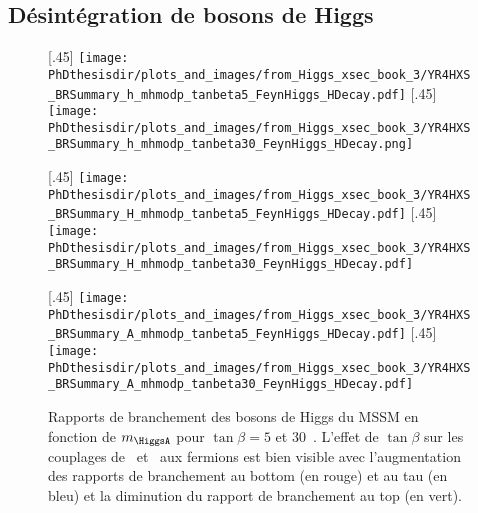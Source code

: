 \subsection{Désintégration de bosons de Higgs}\label{chapter-MS-MSSM-section-pheno_Higgs_MSSM-subsec-desintegration_Higgs}
\begin{figure}[p]
\centering
{}[.45\textwidth]
{\texttt{[image: \\PhDthesisdir/plots\_and\_images/from\_Higgs\_xsec\_book\_3/YR4HXS\_BRSummary\_h\_mhmodp\_tanbeta5\_FeynHiggs\_HDecay.pdf]}\vspace{-.5\baselineskip}}
\hfill
{}[.45\textwidth]
{\texttt{[image: \\PhDthesisdir/plots\_and\_images/from\_Higgs\_xsec\_book\_3/YR4HXS\_BRSummary\_h\_mhmodp\_tanbeta30\_FeynHiggs\_HDecay.png]}\vspace{-.5\baselineskip}}

\vspace{.75\baselineskip}
[.45\textwidth]
{\texttt{[image: \\PhDthesisdir/plots\_and\_images/from\_Higgs\_xsec\_book\_3/YR4HXS\_BRSummary\_H\_mhmodp\_tanbeta5\_FeynHiggs\_HDecay.pdf]}\vspace{-.5\baselineskip}}
\hfill
{}[.45\textwidth]
{\texttt{[image: \\PhDthesisdir/plots\_and\_images/from\_Higgs\_xsec\_book\_3/YR4HXS\_BRSummary\_H\_mhmodp\_tanbeta30\_FeynHiggs\_HDecay.pdf]}\vspace{-.5\baselineskip}}

\vspace{.75\baselineskip}
[.45\textwidth]
{\texttt{[image: \\PhDthesisdir/plots\_and\_images/from\_Higgs\_xsec\_book\_3/YR4HXS\_BRSummary\_A\_mhmodp\_tanbeta5\_FeynHiggs\_HDecay.pdf]}\vspace{-.5\baselineskip}}
\hfill
{}[.45\textwidth]
{\texttt{[image: \\PhDthesisdir/plots\_and\_images/from\_Higgs\_xsec\_book\_3/YR4HXS\_BRSummary\_A\_mhmodp\_tanbeta30\_FeynHiggs\_HDecay.pdf]}\vspace{-.5\baselineskip}}

\caption[Rapports de branchement des bosons de Higgs du MSSM.]{Rapports de branchement des bosons de Higgs du MSSM en fonction de $m_{\HiggsA}$ pour $\tan\beta=5$ et $30$~\cite{Higgs_xsec_book_2,Higgs_xsec_book_3}. L'effet de $\tan\beta$ sur les couplages de \Higgs\ et \HiggsA\ aux fermions est bien visible avec l'augmentation des rapports de branchement au bottom (en rouge) et au tau (en bleu) et la diminution du rapport de branchement au top (en vert).}
\label{fig-BR_hHA_tanbeta_5_30}
\end{figure}
